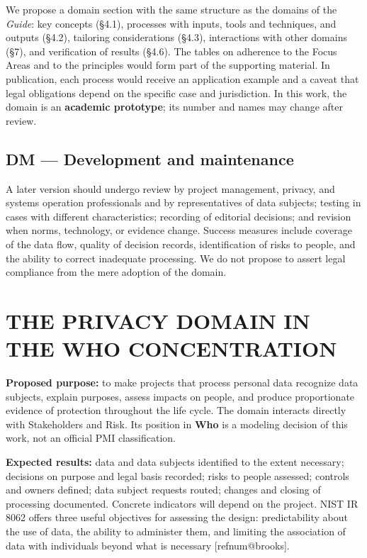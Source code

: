 \documentclass[12pt,a4paper,article,oneside,brazil,english]{abntex2}
\makeatletter
\newcommand{\refnum}[1]{\csname refnum@#1\endcsname}
\makeatother
\begin{document}
We propose a domain section with the same structure as the domains of the \textit{Guide}: key concepts (§4.1), processes with inputs, tools and techniques, and outputs (§4.2), tailoring considerations (§4.3), interactions with other domains (§7), and verification of results (§4.6). The tables on adherence to the Focus Areas and to the principles would form part of the supporting material. In publication, each process would receive an application example and a caveat that legal obligations depend on the specific case and jurisdiction. In this work, the domain is an \textbf{academic prototype}; its number and names may change after review.
\subsection{DM — Development and maintenance}

A later version should undergo review by project management, privacy, and systems operation professionals and by representatives of data subjects; testing in cases with different characteristics; recording of editorial decisions; and revision when norms, technology, or evidence change. Success measures include coverage of the data flow, quality of decision records, identification of risks to people, and the ability to correct inadequate processing. We do not propose to assert legal compliance from the mere adoption of the domain.

\section{THE PRIVACY DOMAIN IN THE WHO CONCENTRATION}

\textbf{Proposed purpose:} to make projects that process personal data recognize data subjects, explain purposes, assess impacts on people, and produce proportionate evidence of protection throughout the life cycle. The domain interacts directly with Stakeholders and Risk. Its position in \textbf{Who} is a modeling decision of this work, not an official PMI classification.

\textbf{Expected results:} data and data subjects identified to the extent necessary; decisions on purpose and legal basis recorded; risks to people assessed; controls and owners defined; data subject requests routed; changes and closing of processing documented. Concrete indicators will depend on the project. NIST IR 8062 offers three useful objectives for assessing the design: predictability about the use of data, the ability to administer them, and limiting the association of data with individuals beyond what is necessary [\refnum{brooks}].
\end{document}
